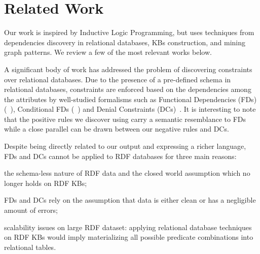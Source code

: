 \section{Related Work} \label{sec:krd_related}

Our work is inspired by Inductive Logic Programming, but uses techniques from dependencies discovery in relational databases, KBs construction, and mining graph patterns. 
We review a few of the most relevant works below.

A significant body of work has addressed the problem of discovering constraints over relational databases. 
Due to the presence of a pre-defined schema in relational databases, constraints are enforced based on the dependencies among the attributes by well-studied formalisms such as 
Functional Dependencies (FDs)(~\cite{abiteboul1995foundations,huhtala1999tane,wyss2001fastfds}), Conditional FDs (~\cite{fan2011discovering}) 
and Denial Constraints (DCs)~\cite{chu2013discovering}. It is interesting to note that the positive rules we discover using \krd carry 
a semantic resemblance to FDs while 
a close parallel can be drawn between our negative rules and DCs.
%

Despite being directly related to our output and expressing a richer language, FDs and DCs cannot be applied to RDF databases for three main reasons:
\begin{inparaenum}[\itshape(i)]
	\item the schema-less nature of RDF data and the closed world assumption which no longer holds on RDF KBs;
	\item FDs and DCs rely on the assumption that data is either clean or has a negligible amount of errors;
	\item scalability issues on large RDF dataset: applying relational database techniques on RDF KBs would imply materializing all possible predicate combinations into relational tables.
\end{inparaenum}

